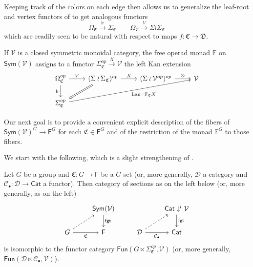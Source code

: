 \documentclass[a4paper,10pt
,draft
]{article}%
\renewcommand{\1}{\eta}%
\begin{document}
Keeping track of the colors on each edge then allows us to generalize the leaf-root and vertex functors of 
\cite{BP_geo} to get analogous functors
\[
\Omega_{\mathfrak{C}} \xrightarrow{\mathsf{lr}} \Sigma_{\mathfrak{C}}
\qquad
\Omega_{\mathfrak{C}} \xrightarrow{V} \Sigma \wr \Sigma_{\mathfrak{C}}
\]
which are readily seen to be natural with respect to maps 
$f \colon \mathfrak{C} \to \mathfrak{D}$.

If $\mathcal{V}$ is a closed symmetric monoidal category, the free operad monad $\mathbb{F}$ on $\mathsf{Sym}(\mathcal{V})$ 
assigns to a functor
$\Sigma_{\mathfrak{C}}^{op} \xrightarrow{X} \mathcal{V}$
the left Kan extension
\begin{equation}
\begin{tikzcd}
	\Omega^{op}_{\mathfrak{C}}
	\arrow[d, "\mathsf{lr}"']
	\arrow[r, "V"]
&
	(\Sigma \wr \Sigma_{\mathfrak{C}})^{op} \arrow[r, "X"]
	\arrow[dl, Rightarrow]
&
	(\Sigma \wr \V^{op})^{op} \arrow[r, "\otimes"]
&
	\V
\\
	\Sigma^{op}_{\mathfrak{C}} \arrow[urrr, "\Lan = \mathbb F_{\mathfrak{C}} X"']
\end{tikzcd}
\end{equation}


Our next goal is to provide a convenient explicit description of the fibers of $\mathsf{Sym}(\mathcal{V})^G \to \mathsf{F}^G$
for each $\mathfrak{C} \in \mathsf{F}^G$
and of the restriction of the monad $\mathbb{F}^G$ to those fibers.

We start with the following, which is a slight strengthening of
\cite[Lemma A.6]{BP_geo}.

\begin{lemma}\label{EQUIVFUNCONV LEM}
Let $G$ be a group and $\mathfrak{C} \colon G \to \mathsf{F}$ be a $G$-set (or, more generally, $\mathcal{D}$ a category and 
$\mathcal{C}_{\bullet}\colon \mathcal{D} \to \mathsf{Cat}$ a functor). Then category of sections as on the left below (or, more generally, as on the left)
\begin{equation}
	\begin{tikzcd}
		&
		\mathsf{Sym}(\mathcal{V}) \arrow{d}{\mathsf{fgt}}
&
		&
		\mathsf{Cat}\downarrow^l \mathcal{V} \arrow{d}{\mathsf{fgt}}
\\
		G \arrow{r}[swap]{\mathfrak{C}} \arrow[dashed]{ru} &
		\mathsf{F}
&
		\mathcal{D} \arrow{r}[swap]{\mathcal{C}_{\bullet}} \arrow[dashed]{ru} &
		\mathsf{Cat}
	\end{tikzcd}
\end{equation}
is isomorphic to the functor category
$\mathsf{Fun}(G\ltimes \Sigma_{\mathfrak{C}}^{op},\mathcal{V})$
(or, more generally, $\mathsf{Fun}(\mathcal{D} \ltimes \mathcal{C}_{\bullet},\mathcal{V})$).
\end{lemma}
\end{document}
